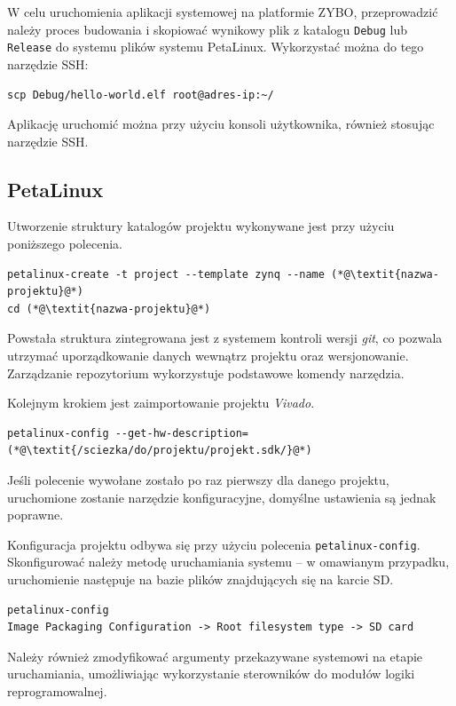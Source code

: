 W celu uruchomienia aplikacji systemowej na platformie ZYBO, przeprowadzić należy proces budowania i skopiować wynikowy plik z katalogu \texttt{Debug} lub \texttt{Release} do systemu plików systemu PetaLinux. Wykorzystać można do tego narzędzie SSH:

\begin{lstlisting}[breaklines=true]
scp Debug/hello-world.elf root@adres-ip:~/
\end{lstlisting}

Aplikację uruchomić można przy użyciu konsoli użytkownika, również stosując narzędzie SSH.
\subsection{PetaLinux}
\label{sec:petalinux-config}

Utworzenie struktury katalogów projektu wykonywane jest przy użyciu poniższego polecenia.

\begin{lstlisting}[breaklines=true]
petalinux-create -t project --template zynq --name (*@\textit{nazwa-projektu}@*)
cd (*@\textit{nazwa-projektu}@*)
\end{lstlisting}

Powstała struktura zintegrowana jest z systemem kontroli wersji \emph{git}, co pozwala utrzymać uporządkowanie danych wewnątrz projektu oraz wersjonowanie. Zarządzanie repozytorium wykorzystuje podstawowe komendy narzędzia.

Kolejnym krokiem jest zaimportowanie projektu \emph{Vivado}.

\begin{lstlisting}[breaklines=true]
petalinux-config --get-hw-description=(*@\textit{/sciezka/do/projektu/projekt.sdk/}@*)
\end{lstlisting}

Jeśli polecenie wywołane zostało po raz pierwszy dla danego projektu, uruchomione zostanie narzędzie konfiguracyjne, domyślne ustawienia są jednak poprawne.

Konfiguracja projektu odbywa się przy użyciu polecenia \texttt{petalinux-config}.
Skonfigurować należy metodę uruchamiania systemu -- w omawianym przypadku, uruchomienie następuje na bazie plików znajdujących się na karcie SD.
\begin{lstlisting}[breaklines=true]
petalinux-config
Image Packaging Configuration -> Root filesystem type -> SD card
\end{lstlisting}

Należy również zmodyfikować argumenty przekazywane systemowi na etapie uruchamiania, umożliwiając wykorzystanie sterowników do modułów logiki reprogramowalnej.

